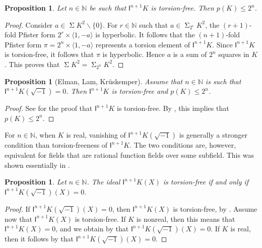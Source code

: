 \documentclass[12pt,leqno]{amsart}
\newcommand{\la}{\langle}
\newcommand{\ra}{\rangle}
\newcommand{\nat}{\mathbb{N}}
\renewcommand{\setminus}{\smallsetminus}
\DeclareMathOperator{\newsum}{\mathsf{\Sigma}}
\renewcommand{\sum}{\newsum}
\newcommand{\sums}[1]{\sum\!{#1}^2}
\newcommand{\sos}[2]{\sum_{#1}\!{#2}^2}
\renewcommand{\leq}{\leqslant}
\newcommand{\I}{\mathsf{I}}
\numberwithin{equation}{section}
\newtheorem{prop}[equation]{Proposition}
\theoremstyle{definition}
\theoremstyle{plain}
\begin{document}
\begin{prop}\label{P:torsfree-pbound}
    Let $n\in\nat$ be such that $\I^{n+1}K$ is torsion-free. Then $p(K)\leq 2^n$.
\end{prop}
\begin{proof}
Consider $a\in\sums{K}\setminus\{0\}$.
For $r\in\nat$ such that $a\in\sos{2^r}{K}$, the $(r+1)$-fold Pfister form $2^r\times \la 1,-a\ra$ is hyperbolic.
It follows that the $(n+1)$-fold Pfister form $\pi=2^n\times \la 1,-a\ra$ represents a torsion element of $\I^{n+1}K$.
Since $\I^{n+1}K$ is torsion-free, it follows that $\pi$ is hyperbolic.
Hence $a$ is a sum of $2^n$ squares in $K$. This proves that $\sums{K}=\sos{2^n}{K}$.
\end{proof}
\begin{prop}[Elman, Lam, Kr\"uskemper]
\label{ELK} 
Assume that $n\in\nat$ is such that $\I^{n+1}K(\sqrt{-1})=0$. Then $\I^{n+1}K$ is torsion-free and $p(K)\leq 2^n$.
\end{prop}
\begin{proof}
See \cite[Cor.~35.27]{EKM08} for the proof that $\I^{n+1}K$ is torsion-free. 
By , this implies that $p(K)\leq 2^n$.
\end{proof}

For $n\in\nat$, when $K$ is real, vanishing of $\I^{n+1}K(\sqrt{-1})$ is generally a stronger condition than torsion-freeness of $\I^{n+1}K$. The two conditions are, however, equivalent for fields that are rational function fields over some subfield. This was shown essentially in \cite[Theorem 6.9]{BL13}.

\begin{prop}\label{P:BL-rational-torsfree}
Let $n\in\nat$.
The ideal $\I^{n+1}K(X)$ is torsion-free if and only if $\I^{n+1}K(\sqrt{-1})(X)=0$.
\end{prop}
\begin{proof}
If $\I^{n+1}K(\sqrt{-1})(X)=0$, then $\I^{n+1}K(X)$ is torsion-free, by .
Assume now that $\I^{n+1}K(X)$ is torsion-free.
If $K$ is nonreal, then this means that $\I^{n+1}K(X)=0$, and we obtain by \cite[Cor.~35.13]{EKM08} that $\I^{n+1}K(\sqrt{-1})(X)=0$.
If $K$ is real, then it follows by \cite[Theorem 6.9]{BL13} that $\I^{n+1}K(\sqrt{-1})(X)=0$.
\end{proof}
\end{document}
